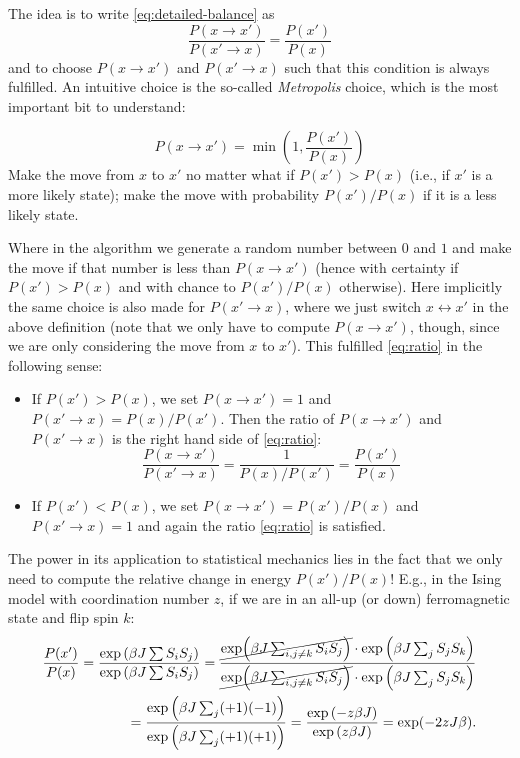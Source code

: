 \documentclass{report}
\begin{document}
The idea is to write \cref{eq:detailed-balance} as 
\begin{equation}\label{eq:ratio}
	\frac{P(x \rightarrow x')}{P(x' \rightarrow x)} = 
	\frac{P(x')}{P(x)}
\end{equation}
and to choose $ P(x \rightarrow x') $ and $ P(x' \rightarrow x) $ such that 
this condition is always fulfilled. An intuitive choice is the so-called 
\textit{Metropolis} choice, which is the most important bit to understand:
\begin{thinbluebox}
	\begin{equation*}
		P(x \rightarrow x')
		= \min \left( 1,
		\frac{P(x')}{P(x)}
		\right)
	\end{equation*}
Make the move from $ x $ to $ x' $ no matter what if $ P(x') > P(x) $ (i.e., 
if $ x' $ is a more likely state); make the move with probability $ P(x')/P(x) $
if it is a less likely state.
\end{thinbluebox}
Where in the algorithm we generate a random number between $ 0 $ and $ 1 $ 
and make the move if that number is less than $ P(x  \rightarrow x') $ (hence 
with certainty if $ P(x') > P(x) $ and with chance to $ P(x')/P(x) $
otherwise). Here implicitly the same choice is also made for $ P(x' \rightarrow x) $, 
where we just switch $ x \longleftrightarrow x' $ in the above definition (note 
that we only have to compute $ P(x \rightarrow x') $, though, since we are only 
considering the move from $ x $ to $ x' $).  This fulfilled \cref{eq:ratio} in
the following sense: 
\begin{itemize}
\item If $ P(x') > P(x) $, we set $ P(x \rightarrow x') = 1 $ and $ P(x'
	\rightarrow x)  = P(x)/ P(x')$. Then the ratio of $ P(x \rightarrow x') $ and $
	P(x' \rightarrow x) $ is the right hand side of \cref{eq:ratio}: 
	\begin{equation*}
		\frac{P(x \rightarrow x')}{P( x' \rightarrow x)} 
		= \frac{1}{P(x)/P(x')} 
		= \frac{P(x')}{P(x)}
	\end{equation*}
\item If $ P(x') < P(x) $, we set $ P(x \rightarrow x') = P(x')/{P(x)} $ and 
	$ P(x' \rightarrow x)  = 1$  and again the ratio \cref{eq:ratio} is satisfied.
\end{itemize}

The power in its application to statistical mechanics lies in the fact that we 
only need to compute the relative change in energy $ P(x')/P(x) $! E.g., 
in the Ising model with coordination number $ z $, if we are in an all-up (or
down) ferromagnetic state and flip spin $ k $:
\begin{align*}
	\frac{P(x')}{P(x)} = \frac{\exp\left(\beta J \sum S_i S_j \right)}{\exp\left(\beta J\sum S_iS_j\right)}
	= \frac{
		\cancel{\exp(\beta J\sum_{i,j\neq k}S_i S_j)}\cdot \exp \left( \beta J\sum_j S_j S_k \right)
	}{
		\cancel{\exp(\beta J\sum_{i,j\neq k}S_i S_j)}\cdot \exp \left(\beta J\sum_j S_j S_k \right)
		}\\
	= \frac{
		\exp \left(\beta J\sum_j (+1) (-1) \right)
	}{
		\exp \left( \beta J\sum_j (+1) (+1) \right)
	}
	= \frac{
		\exp \left( -z \beta J\right)
	}{
		\exp \left( z\beta J\right)
	}
	= \exp(-2zJ\beta).
\end{align*}
\end{document}

